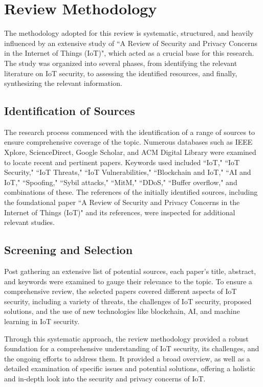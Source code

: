 

\section{Review Methodology}
\label{sec:methodology}

The methodology adopted for this review is systematic, structured, and heavily influenced by an extensive study of ``A Review of Security and Privacy Concerns in the Internet of Things (IoT)\cite{aqeel2022review}", which acted as a crucial base for this research. The study was organized into several phases, from identifying the relevant literature on IoT security, to assessing the identified resources, and finally, synthesizing the relevant information.

\subsection{Identification of Sources}
The research process commenced with the identification of a range of sources to ensure comprehensive coverage of the topic. Numerous databases such as IEEE Xplore, ScienceDirect, Google Scholar, and ACM Digital Library were examined to locate recent and pertinent papers. Keywords used included ``IoT," ``IoT Security," ``IoT Threats," ``IoT Vulnerabilities," ``Blockchain and IoT," ``AI and IoT," ``Spoofing," ``Sybil attacks," ``MitM," ``DDoS," ``Buffer overflow," and combinations of these. The references of the initially identified sources, including the foundational paper ``A Review of Security and Privacy Concerns in the Internet of Things (IoT)" and its references, were inspected for additional relevant studies.

\subsection{Screening and Selection}

Post gathering an extensive list of potential sources, each paper's title, abstract, and keywords were examined to gauge their relevance to the topic. To ensure a comprehensive review, the selected papers covered different aspects of IoT security, including a variety of threats, the challenges of IoT security, proposed solutions, and the use of new technologies like blockchain, AI, and machine learning in IoT security.

Through this systematic approach, the review methodology provided a robust foundation for a comprehensive understanding of IoT security, its challenges, and the ongoing efforts to address them. It provided a broad overview, as well as a detailed examination of specific issues and potential solutions, offering a holistic and in-depth look into the security and privacy concerns of IoT.
